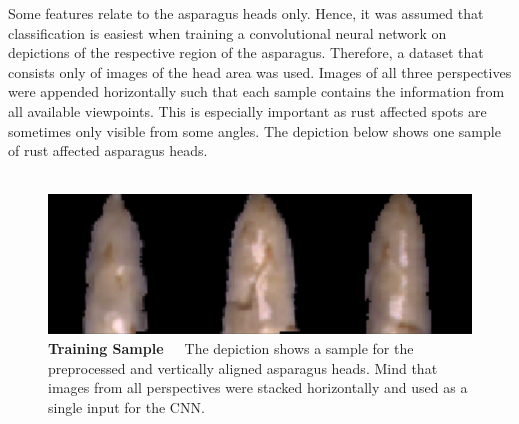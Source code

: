 Some features relate to the asparagus heads only. Hence, it was assumed that classification is easiest when training a convolutional neural network on depictions of the respective region of the asparagus. Therefore, a dataset that consists only of images of the head area was used. Images of all three perspectives were appended horizontally such that each sample contains the information from all available viewpoints. This is especially important as rust affected spots are sometimes only visible from some angles. The depiction below shows one sample of rust affected asparagus heads. \\
\\
\begin{figure}[h]
	\centering
	\includegraphics[scale=0.4]{Figures/chapter04/head_example.png}
	\decoRule
	\caption[Training Sample of Preprocessed and Aligned Asparagus Heads]{\textbf{Training Sample}~~~The depiction shows a sample for the preprocessed and vertically aligned asparagus heads. Mind that images from all perspectives were stacked horizontally and used as a single input for the CNN.}
	\label{fig:HeadExample}
\end{figure}

\begin{table}[h]
	\centering
	\caption[??]{\textbf{??}~~~??}
	\label{tab:}
\end{table}

